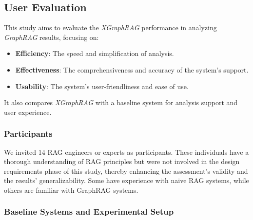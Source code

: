 \subsection{User Evaluation}
This study aims to evaluate the \textit{XGraphRAG} performance in analyzing \textit{GraphRAG} results, focusing on:

\begin{itemize}
\item \textbf{Efficiency}: The speed and simplification of analysis.
\item \textbf{Effectiveness}: The comprehensiveness and accuracy of the system's support.
\item \textbf{Usability}: The system's user-friendliness and ease of use.
\end{itemize}

It also compares \textit{XGraphRAG} with a baseline system for analysis support and user experience.



\subsubsection{Participants}
We invited 14 RAG engineers or experts as participants. These individuals have a thorough understanding of RAG principles but were not involved in the design requirements phase of this study, thereby enhancing the assessment's validity and the results' generalizability. Some have experience with naive RAG systems, while others are familiar with GraphRAG systems.

\subsubsection{Baseline Systems and Experimental Setup}

